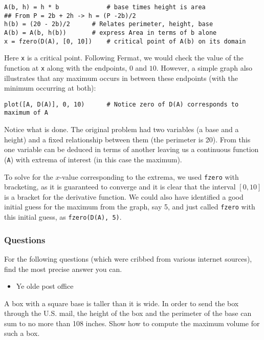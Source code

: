 \documentclass[12pt]{article}
\begin{document}
\begin{verbatim}
A(b, h) = h * b             # base times height is area
## From P = 2b + 2h -> h = (P -2b)/2
h(b) = (20 - 2b)/2      # Relates perimeter, height, base
A(b) = A(b, h(b))       # express Area in terms of b alone
x = fzero(D(A), [0, 10])    # critical point of A(b) on its domain
\end{verbatim}
Here \texttt{x} is a critical point. Following Fermat, we would check
the value of the function at \texttt{x} along with the endpoints, $0$
and $10$. However, a simple graph also illustrates that any maximum
occurs in between these endpoints (with the minimum occurring at both):



\begin{verbatim}
plot([A, D(A)], 0, 10)      # Notice zero of D(A) corresponds to maximum of A
\end{verbatim}
Notice what is done. The original problem had two variables (a base and
a height) and a fixed relationship between them (the perimeter is 20).
From this one variable can be deduced in terms of another leaving us a
continuous function (\texttt{A}) with extrema of interest (in this case
the maximum).

To solve for the $x$-value corresponding to the extrema, we used
\texttt{fzero} with bracketing, as it is guaranteed to converge and it
is clear that the interval $[0,10]$ is a bracket for the derivative
function. We could also have identified a good initial guess for the
maximum from the graph, say 5, and just called \texttt{fzero} with this
initial guess, as \texttt{fzero(D(A), 5)}.

\subsubsection{Questions}

For the following questions (which were cribbed from various internet
sources), find the most precise answer you can.

\begin{itemize}
\itemsep1pt\parskip0pt
\item
  Ye olde post office
\end{itemize}

A box with a square base is taller than it is wide. In order to send the
box through the U.S. mail, the height of the box and the perimeter of
the base can sum to no more than 108 inches. Show how to compute the
maximum volume for such a box.
\end{document}
